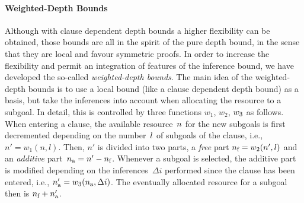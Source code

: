 \paragraph{Weighted-Depth Bounds} 

Although with clause dependent depth bounds a higher flexibility can be
obtained, those bounds are all in the spirit of the pure depth bound, in the 
sense that they are local and favour symmetric proofs.
In order to increase the flexibility and permit an integration of
features of the inference bound, we have developed the so-called 
{\em weighted-depth bounds}.
The main idea of the weighted-depth bounds is to use a local bound (like
a clause dependent depth bound) as a basis, but take the inferences into 
account when allocating the resource to a subgoal.
In detail, this is controlled by three functions $w_1$,
$w_2$, $w_3\/$ as follows.
When entering a clause, the available resource~$n\/$ for the new subgoals
is first decremented depending on the number~$l\/$ of subgoals of the clause,
i.e., $n' = w_1(n,l)$. 
Then, $n'$ is divided into two parts, a {\em free\/} part 
$n_{\mbox{\scriptsize f}} = w_2(n',l)$ and an {\em additive\/}
part~$n_{\mbox{\scriptsize a}} = n' - n_{\mbox{\scriptsize f}}$.
Whenever a subgoal is selected, the additive part is modified depending
on the inferences~$\Delta i$ performed since the clause has been entered,
i.e., $n_{\mbox{\scriptsize a}}' = w_3(n_{\mbox{\scriptsize a}},\Delta i)$. 
The eventually allocated resource for a subgoal then is
$n_{\mbox{\scriptsize f}} + n_{\mbox{\scriptsize a}}'$. 

